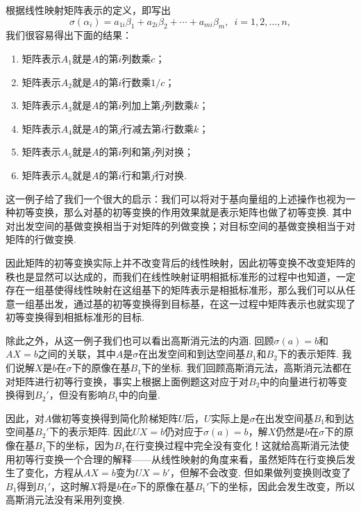 \begin{solution}
    根据线性映射矩阵表示的定义，即写出
    \[\sigma(\alpha_i)=a_{1i}\beta_1+a_{2i}\beta_2+\cdots+a_{mi}\beta_m,\enspace i=1,2,\ldots,n,\]
    我们很容易得出下面的结果：
    \begin{enumerate}
        \item 矩阵表示$A_1$就是$A$的第$i$列数乘$c$；

        \item 矩阵表示$A_2$就是$A$的第$i$行数乘$1/c$；

        \item 矩阵表示$A_3$就是$A$的第$i$列加上第$j$列数乘$k$；

        \item 矩阵表示$A_4$就是$A$的第$j$行减去第$i$行数乘$k$；

        \item 矩阵表示$A_5$就是$A$的第$i$列和第$j$列对换；

        \item 矩阵表示$A_6$就是$A$的第$i$行和第$j$行对换.
    \end{enumerate}
\end{solution}

这一例子给了我们一个很大的启示：我们可以将对于基向量组的上述操作也视为一种初等变换，那么对基的初等变换的作用效果就是表示矩阵也做了初等变换. 其中对出发空间的基做变换相当于对矩阵的列做变换；对目标空间的基做变换相当于对矩阵的行做变换.

因此矩阵的初等变换实际上并不改变背后的线性映射，因此初等变换不改变矩阵的秩也是显然可以达成的，而我们在线性映射证明相抵标准形的过程中也知道，一定存在一组基使得线性映射在这组基下的矩阵表示是相抵标准形，那么我们可以从任意一组基出发，通过基的初等变换得到目标基，在这一过程中矩阵表示也就实现了初等变换得到相抵标准形的目标.

除此之外，从这一例子我们也可以看出高斯消元法的内涵. 回顾$\sigma(a)=b$和$AX=b$之间的关联，其中$A$是$\sigma$在出发空间和到达空间基$B_1$和$B_2$下的表示矩阵. 我们说解$X$是$b$在$\sigma$下的原像在基$B_1$下的坐标. 我们回顾高斯消元法，高斯消元法都在对矩阵进行初等行变换，事实上根据上面例题这对应于对$B_2$中的向量进行初等变换得到$B_2'$，但没有影响$B_1$中的向量.

因此，对$A$做初等变换得到简化阶梯矩阵$U$后，$U$实际上是$\sigma$在出发空间基$B_1$和到达空间基$B_2'$下的表示矩阵. 因此$UX=b$仍对应于$\sigma(a)=b$，解$X$仍然是$b$在$\sigma$下的原像在基$B_1$下的坐标，因为$B_1$在行变换过程中完全没有变化！这就给高斯消元法使用初等行变换一个合理的解释——从线性映射的角度来看，虽然矩阵在行变换后发生了变化，方程从$AX=b$变为$UX=b'$，但解不会改变. 但如果做列变换则改变了$B_1$得到$B_1'$，这时解$X$将是$b$在$\sigma$下的原像在基$B_1'$下的坐标，因此会发生改变，所以高斯消元法没有采用列变换.

